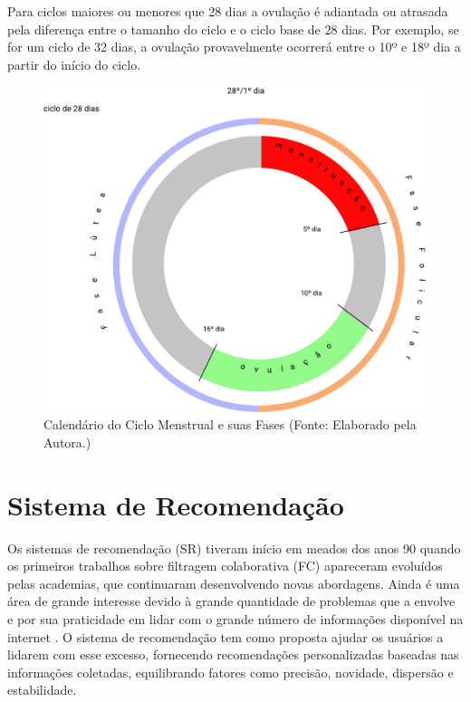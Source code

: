 Para ciclos maiores ou 
menores que 28 dias a ovulação é adiantada ou atrasada pela diferença 
entre o tamanho do ciclo e o ciclo base de 28 dias. Por exemplo, se for 
um ciclo de 32 dias, a ovulação provavelmente ocorrerá entre o 10º e 18º dia 
a partir do início do ciclo.


\begin{figure}[h]
	\centering
	\includegraphics[keepaspectratio=true,scale=0.4]{figuras/Group1.pdf}
	\caption{Calendário do Ciclo Menstrual e suas Fases (Fonte: Elaborado pela Autora.)}
        \label{fig02}
\end{figure}


\section{Sistema de Recomendação}
 
Os sistemas de recomendação (SR) tiveram início em meados dos anos 90 
quando os primeiros trabalhos sobre filtragem colaborativa (FC) 
apareceram \cite{felferning2008} evoluídos pelas academias, 
que continuaram desenvolvendo novas abordagens. 
Ainda é uma área de grande interesse devido à grande quantidade de 
problemas que a envolve e por sua praticidade em lidar com o grande 
número de informações disponível na internet \cite{adomavicius2005}. 
O sistema de recomendação tem como proposta ajudar os usuários a lidarem com esse 
excesso, fornecendo recomendações personalizadas baseadas nas informações 
coletadas, equilibrando fatores como precisão, novidade, dispersão e 
estabilidade\cite{bobadilla2013}.


